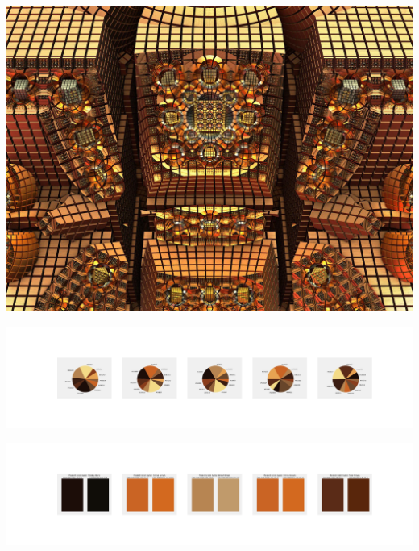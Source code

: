 \documentclass[11pt]{article}
\begin{document}
\begin{landscape}
    \begin{center}
    \includegraphics[width=\textwidth]{./nbimg/file (17).jpg}
    \end{center}

    \begin{center}
    \includegraphics[width=250mm]{./nbimg/pie-78.jpg}
    \end{center}

    \begin{center}
    \includegraphics[width=250mm]{./nbimg/peak-78.jpg}
    \end{center}
    


\end{landscape}
\end{document}
